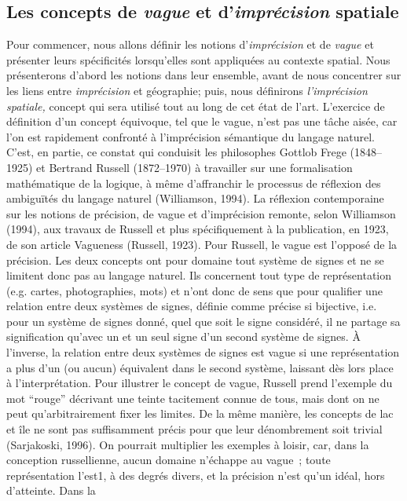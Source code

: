 \subsection{Les concepts de \emph{vague} et d’\emph{imprécision} spatiale}

Pour commencer, nous allons définir les notions d’\emph{imprécision}
et de \emph{vague} et présenter leurs spécificités lorsqu’elles sont
appliquées au contexte spatial. Nous présenterons d’abord les notions
dans leur ensemble, avant de nous concentrer sur les liens entre
\emph{imprécision} et géographie; puis, nous définirons\emph{
  l’imprécision spatiale,} concept qui sera utilisé tout au long de
cet état de l’art.  L’exercice de définition d’un concept équivoque,
tel que le vague, n’est pas une tâche aisée, car l’on est rapidement
confronté à l’imprécision sémantique du langage naturel. C’est, en
partie, ce constat qui conduisit les philosophes Gottlob Frege
(1848–1925) et Bertrand Russell (1872–1970) à travailler sur une
formalisation mathématique de la logique, à même d’affranchir le
processus de réflexion des ambiguïtés du langage naturel (Williamson,
1994). La réflexion contemporaine sur les notions de précision, de
vague et d’imprécision remonte, selon Williamson (1994), aux travaux
de Russell et plus spécifiquement à la publication, en 1923, de son
article Vagueness (Russell, 1923). Pour Russell, le vague est l’opposé
de la précision. Les deux concepts ont pour domaine tout système de
signes et ne se limitent donc pas au langage naturel. Ils concernent
tout type de représentation (e.g. cartes, photographies, mots) et
n’ont donc de sens que pour qualifier une relation entre deux systèmes
de signes, définie comme précise si bijective, i.e. pour un système de
signes donné, quel que soit le signe considéré, il ne partage sa
signification qu’avec un et un seul signe d’un second système de
signes. À l’inverse, la relation entre deux systèmes de signes est
vague si une représentation a plus d’un (ou aucun) équivalent dans le
second système, laissant dès lors place à l’interprétation. Pour
illustrer le concept de vague, Russell prend l’exemple du mot “rouge”
décrivant une teinte tacitement connue de tous, mais dont on ne peut
qu’arbitrairement fixer les limites. De la même manière, les concepts
de lac et île ne sont pas suffisamment précis pour que leur
dénombrement soit trivial (Sarjakoski, 1996). On pourrait multiplier
les exemples à loisir, car, dans la conception russellienne, aucun
domaine n’échappe au vague ; toute représentation l’est1, à des degrés
divers, et la précision n’est qu’un idéal, hors d’atteinte.  Dans la
